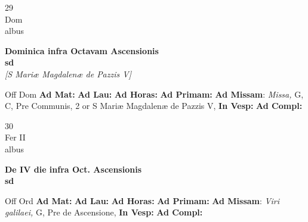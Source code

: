 \documentclass[10pt, openany]{book}
\begin{document}
    \begin{center}
        \begin{minipage}{3.5in}
            \vspace{2em}
            \begin{minipage}{0.5in}
                {\Huge 29} \\
                {\normalsize Dom} \\
                {\normalsize albus}
            \end{minipage}
            \begin{minipage}{3.0in}
                \textbf{ \large Dominica infra Octavam Ascensionis \\
                \textnormal{\normalsize sd}} \\ \textit{[S Mariæ Magdalenæ de Pazzis V]} \\ 
            \end{minipage}
            \begin{justify}Off Dom
                \textbf{Ad Mat: }
                \textbf{Ad Lau: }
                \textbf{Ad Horas: }
                \textbf{Ad Primam: }\textbf{Ad Missam}: \textit{Missa,} G, C, Pre Communis, 2 or S Mariæ Magdalenæ de Pazzis V,  
                \textbf{In Vesp: }
                \textbf{Ad Compl: }
            \end{justify}
        \end{minipage}
    \end{center}

    \begin{center}
        \begin{minipage}{3.5in}
            \vspace{2em}
            \begin{minipage}{0.5in}
                {\Huge 30} \\
                {\normalsize Fer II} \\
                {\normalsize albus}
            \end{minipage}
            \begin{minipage}{3.0in}
                \textbf{ \large De IV die infra Oct. Ascensionis \\
                \textnormal{\normalsize sd}} \\ 
            \end{minipage}
            \begin{justify}Off Ord
                \textbf{Ad Mat: }
                \textbf{Ad Lau: }
                \textbf{Ad Horas: }
                \textbf{Ad Primam: }\textbf{Ad Missam}: \textit{Viri galilaei,} G, Pre de Ascensione,  
                \textbf{In Vesp: }
                \textbf{Ad Compl: }
            \end{justify}
        \end{minipage}
    \end{center}
\end{document}
